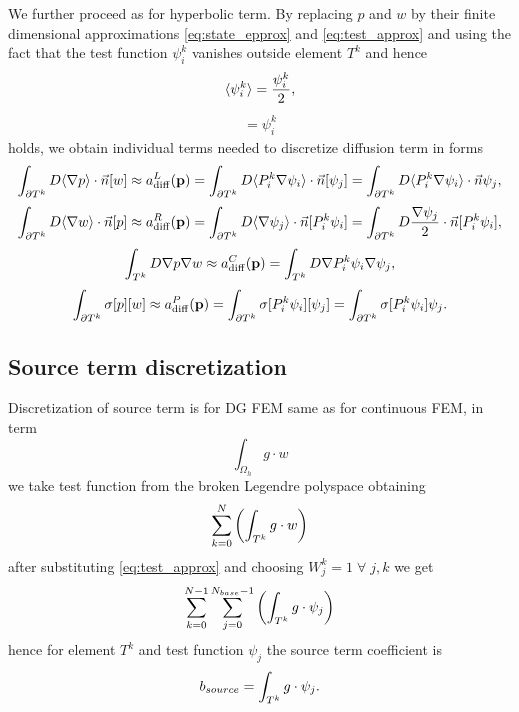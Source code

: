 We further proceed as for hyperbolic term. By replacing $p$ and $w$ by their 
finite dimensional approximations \eqref{eq:state_epprox} and 
\eqref{eq:test_approx} and using the fact that the test function $\psi^k_i$ 
vanishes outside element $T^k$ and hence
\begin{eqnarray}
    \langle\psi^k_i\rangle = \frac{\psi^k_i}{2},
\end{eqnarray}
\begin{eqnarray}
    [\psi^k_i] = \psi^k_i
\end{eqnarray}
holds, we obtain individual terms needed to discretize diffusion term in forms
\begin{equation}\label{eq:diff_left_approx}
    \int_{\partial T^k} D \langle\nabla p\rangle \cdot \vec{n} [w] 
    \approx
    a^L_\mathrm{diff}(\mathbf{p}) = 
        \int_{\partial T^k} D \langle P^k_i\nabla\psi_i\rangle \cdot \vec{n}[\psi_j] =
        \int_{\partial T^k} D \langle P^k_i\nabla\psi_i\rangle \cdot \vec{n}\psi_j,
\end{equation}
\begin{equation}\label{eq:diff_right_approx}
        \int_{\partial T^k} D \langle\nabla w \rangle\cdot \vec{n} [p] 
        \approx
        a^R_\mathrm{diff}(\mathbf{p}) =
            \int_{\partial T^k} D \langle\nabla \psi_j \rangle\cdot \vec{n} [P^k_i\psi_i] =
            \int_{\partial T^k} D \frac{\nabla \psi_j}{2}\cdot \vec{n} 
            [P^k_i\psi_i],
\end{equation}
\begin{equation}\label{eq:diff_laplace_approx}
    \int_{T^k} D\nabla p \nabla w 
    \approx
    a^C_\mathrm{diff}(\mathbf{p})=
        \int_{T^k} D\nabla P^k_i\psi_i \nabla \psi_j,
\end{equation}
\begin{equation}\label{eq:diff_penalty_approx}
        \int_{\partial T^k} \sigma [p][w] 
        \approx
        a^P_\mathrm{diff}(\mathbf{p})=
         \int_{\partial T^k} \sigma [P^k_i\psi_i][\psi_j] 
         = \int_{\partial T^k} \sigma [P^k_i\psi_i]\psi_j.
\end{equation}


\subsection{Source term discretization}
\label{se:source_term}
Discretization of source term is for DG FEM same as for continuous FEM, 
in term
\begin{equation}
    \int_{\Omega_h} g\cdot w
\end{equation}
we take test function from the broken Legendre polyspace obtaining 
\begin{equation}
    \sum\limits_{k=0}^{N}\left(\int_{T^k} g\cdot w\right)
\end{equation}
after substituting \eqref{eq:test_approx} and choosing $W_j^k = 1 \; \forall \; 
j, k$ we get
\begin{equation}
\sum\limits_{k=0}^{N - 1}\sum\limits_{j=0}^{N_{base} - 1}\left(\int_{T^k} g\cdot 
\psi_j \right)
\end{equation}
hence for element $T^k$ and test function $\psi_j$ the source term coefficient 
is
\begin{equation}
    b_{source} = \int_{T^k} g\cdot \psi_j.
\end{equation}

